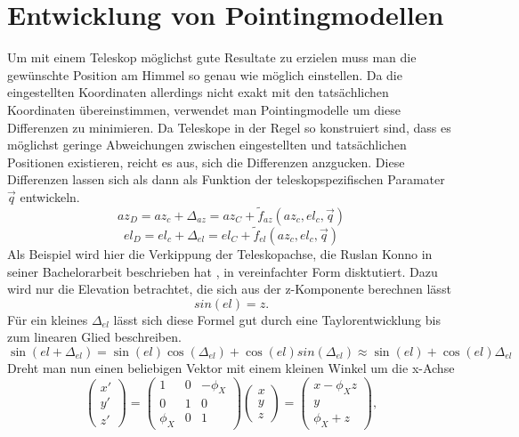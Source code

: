 \section{Entwicklung von Pointingmodellen}
Um mit einem Teleskop möglichst gute Resultate zu erzielen muss man die gewünschte Position am Himmel so genau wie möglich einstellen. Da die eingestellten Koordinaten allerdings nicht exakt mit den tatsächlichen Koordinaten übereinstimmen, verwendet man Pointingmodelle um diese Differenzen zu minimieren. Da Teleskope in der Regel so konstruiert sind, dass es möglichst geringe Abweichungen zwischen eingestellten und tatsächlichen Positionen existieren, reicht es aus, sich die Differenzen anzgucken. Diese Differenzen lassen sich als dann als Funktion der teleskopspezifischen Paramater $\vec{q}$ entwickeln.
\begin{equation}
az_D=az_c+\Delta_{az}=az_C+\tilde{f}_{az}\left(az_c,el_c,\vec{q}\right)
\end{equation}
\begin{equation}
el_D=el_c+\Delta_{el}=el_C+\tilde{f}_{el}\left(az_c,el_c,\vec{q}\right)
\label{eq:pointingZero}
\end{equation}
Als Beispiel wird hier die Verkippung der Teleskopachse, die Ruslan Konno in seiner Bachelorarbeit beschrieben hat \citep{Ruslan}, in vereinfachter Form disktutiert. Dazu wird nur die Elevation betrachtet, die sich aus der z-Komponente berechnen lässt
\begin{equation}
sin(el)=z.
\end{equation}
Für ein kleines $\Delta_{el}$ lässt sich diese Formel gut durch eine Taylorentwicklung bis zum linearen Glied beschreiben.
\begin{equation}
\sin(el+\Delta_{el})=\sin(el)\cos(\Delta_{el})+\cos(el)sin(\Delta_{el})\approx \sin(el)+\cos(el)\Delta_{el}
\end{equation}
Dreht man nun einen beliebigen Vektor mit einem kleinen Winkel um die x-Achse
\begin{equation}
\left(\begin{array}{c}
x\prime\\y\prime\\z\prime
\end{array}\right)=\left(\begin{array}{ccc}
1 & 0 & -\phi_X\\0 & 1 & 0 \\\phi_X & 0 & 1
\end{array}\right)\left(\begin{array}{c}
x\\y\\z
\end{array}\right)=\left(\begin{array}{c}
x-\phi_Xz\\y\\\phi_X+z
\end{array}\right),
\end{equation}
